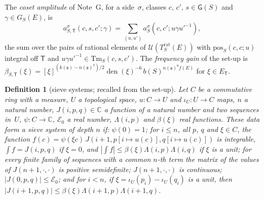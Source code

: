 \documentclass[11pt,a4paper]{article}
\newcommand{\m}[1]{\mbox{$#1$}}        %
\theoremstyle{plainx}
\theoremstyle{uprightx}
\newtheorem{definition}[theorem]{Definition}
\newcommand{\fs}{\mathfrak{s}}                      %
\newcommand{\sT}{\mathsf{T}}                        %
\newcommand{\kk}[1]{k(#1)}                          %
\newcommand{\nn}[1]{n(#1)}                          %
\newcommand{\ninf}[1]{f(#1)}                        %
\newcommand{\ET}[1]{E_{#1}}                         %
\newcommand{\bS}[1]{b(#1)}                          %
\newcommand{\Trat}[2]{T^{\mathrm{rat}}_{#1}(#2)}    %
\newcommand{\GS}[2]{G_{#1}(#2)}                     %
\newcommand{\GRes}[1]{\mathsf{G}(#1)}               %
\newcommand{\pos}[4]{\mathrm{pos}_{#1}(#2,#3;#4)}   %
\newcommand{\terms}[4]{\mathrm{Tm}_{#1}(#2,#3,#4)}  %
\newcommand{\amp}[5]{a^{#1}_{#2}(#3,#4;#5)}         %
\newcommand{\fgain}[3]{\beta_{#1,#2}(#3)}           %
\newcommand{\cosamp}[7]{a^{#1}_{#2,#3}(#4,#5,#6;#7)} %
\newcommand{\CC}{\mathbb{C}}
\begin{document}
The \emph{coset amplitude} of Note~G, for a side~$\sigma$, classes $c$, $c'$, \m{s\in\GRes{S}} and
\m{\gamma\in\GS{S}{E}}, is
\[\cosamp{\sigma}{S}{\sT}{c}{s}{c'}{\gamma}=\sum_{(u,u')}\amp{\sigma}{S}{c}{c'}{u\gamma u'^{-1}},\]
the sum over the pairs of rational elements of $\mathcal U(\Trat{S}{E})$ with $\pos{S}{c}{c}{u}$ integral
off $\sT$ and $u\gamma u'^{-1}\in\terms{S}{c}{s}{c'}$. The \emph{frequency gain} of the set-up is
$\fgain{S}{\sT}{\xi}=[\xi]^{(\kk{\fs}-\nn{\fs}^7)/2}\operatorname{den}(\xi)^{-6}\,\bS{S}^{\nn{\fs}^9\ninf{E}}$
for \m{\xi\in\ET{\sT}}.

\begin{definition}[sieve systems; recalled from the set-up]\label{d:sieve}
Let $C$ be a commutative ring with a measure, $U$ a topological space, \m{u\colon C\to U} and \m{\iota_U\colon U\to
C} maps, $n$ a natural number, \m{J(i,p,q)\in\CC} a function of a natural number and two sequences in~$U$,
\m{\psi\colon C\to\CC}, $\mathcal{E}_0$ a real number, \m{\Lambda(i,p)} and \m{\beta(\xi)} real functions. These
data form a \emph{sieve system} of depth $n$ if:
\m{\psi(0)=1}; for \m{i\le n}, all $p$, $q$ and \m{\xi\in C}, the function
\m{f(c)=\psi(\xi c)\,J(i+1,p[i\mapsto u(c)],q[i\mapsto u(c)])} is integrable, \m{\int f=J(i,p,q)} if \m{\xi=0},
and \m{|\int f|\le\beta(\xi)\Lambda(i,p)\Lambda(i,q)} if $\xi$ is a unit; for every finite family of sequences
with a common $n$-th term the matrix of the values of \m{J(n+1,\cdot,\cdot)} is positive semidefinite;
\m{J(n+1,\cdot,\cdot)} is continuous; \m{|J(0,p,q)|\le\mathcal{E}_0}; and for \m{i<n}, if
\m{\xi=\iota_U(p_i)-\iota_U(q_i)} is a unit, then \m{|J(i+1,p,q)|\le\beta(\xi)\Lambda(i+1,p)\Lambda(i+1,q)}.
\end{definition}
\end{document}
